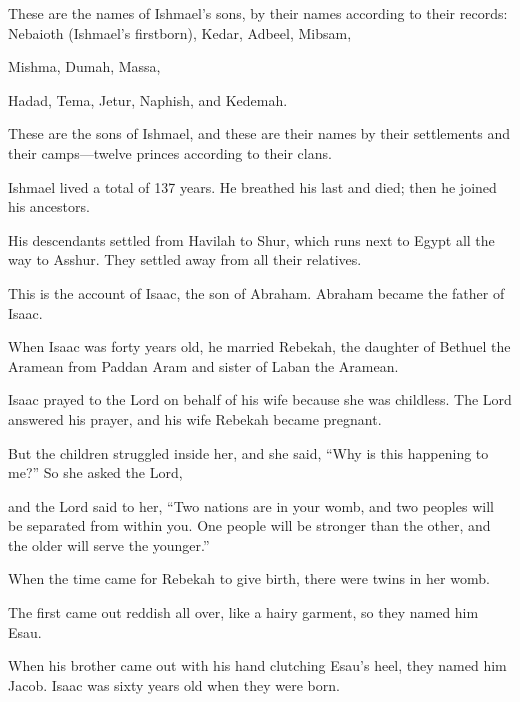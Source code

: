 \begin{scripture}
 These are the names of Ishmael's sons, by their names according to their records: Nebaioth (Ishmael's firstborn), Kedar, Adbeel, Mibsam,
 Mishma, Dumah, Massa,
 Hadad, Tema, Jetur, Naphish, and Kedemah.
 These are the sons of Ishmael, and these are their names by their settlements and their camps---twelve princes according to their clans.
\everypar{}

 Ishmael lived a total of 137 years. He breathed his last and died; then he joined his ancestors.
 His descendants settled from Havilah to Shur, which runs next to Egypt all the way to Asshur. They settled away from all their relatives.
\everypar{}

 This is the account of Isaac, the son of Abraham. Abraham became the father of Isaac.
 When Isaac was forty years old, he married Rebekah, the daughter of Bethuel the Aramean from Paddan Aram and sister of Laban the Aramean.
\everypar{}

 Isaac prayed to the Lord on behalf of his wife because she was childless. The Lord answered his prayer, and his wife Rebekah became pregnant.
 But the children struggled inside her, and she said, ``Why is this happening to me?'' So she asked the Lord,
\everypar{}

 and the Lord said to her, ``Two nations are in your womb, and two peoples will be separated from within you. One people will be stronger than the other, and the older will serve the younger.''
\everypar{}

 When the time came for Rebekah to give birth, there were twins in her womb.
 The first came out reddish all over, like a hairy garment, so they named him Esau.
 When his brother came out with his hand clutching Esau's heel, they named him Jacob. Isaac was sixty years old when they were born.
\everypar{}


\end{scripture}
